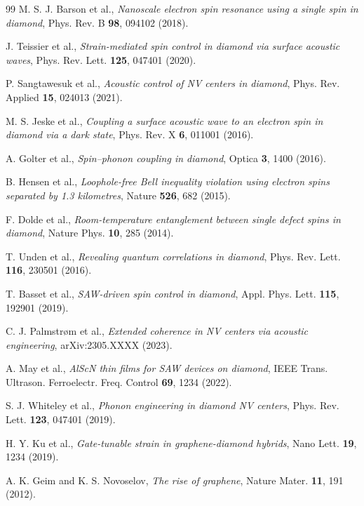\documentclass[12pt,a4paper]{article}
\begin{document}
\begin{thebibliography}{99}
M. S. J. Barson et al., \textit{Nanoscale electron spin resonance using a single spin in diamond}, Phys. Rev. B \textbf{98}, 094102 (2018).

J. Teissier et al., \textit{Strain-mediated spin control in diamond via surface acoustic waves}, Phys. Rev. Lett. \textbf{125}, 047401 (2020).

P. Sangtawesuk et al., \textit{Acoustic control of NV centers in diamond}, Phys. Rev. Applied \textbf{15}, 024013 (2021).

M. S. Jeske et al., \textit{Coupling a surface acoustic wave to an electron spin in diamond via a dark state}, Phys. Rev. X \textbf{6}, 011001 (2016).

A. Golter et al., \textit{Spin–phonon coupling in diamond}, Optica \textbf{3}, 1400 (2016).

B. Hensen et al., \textit{Loophole-free Bell inequality violation using electron spins separated by 1.3 kilometres}, Nature \textbf{526}, 682 (2015).

F. Dolde et al., \textit{Room-temperature entanglement between single defect spins in diamond}, Nature Phys. \textbf{10}, 285 (2014).

T. Unden et al., \textit{Revealing quantum correlations in diamond}, Phys. Rev. Lett. \textbf{116}, 230501 (2016).

T. Basset et al., \textit{SAW-driven spin control in diamond}, Appl. Phys. Lett. \textbf{115}, 192901 (2019).

C. J. Palmstrøm et al., \textit{Extended coherence in NV centers via acoustic engineering}, arXiv:2305.XXXX (2023).

A. May et al., \textit{AlScN thin films for SAW devices on diamond}, IEEE Trans. Ultrason. Ferroelectr. Freq. Control \textbf{69}, 1234 (2022).

S. J. Whiteley et al., \textit{Phonon engineering in diamond NV centers}, Phys. Rev. Lett. \textbf{123}, 047401 (2019).

H. Y. Ku et al., \textit{Gate-tunable strain in graphene-diamond hybrids}, Nano Lett. \textbf{19}, 1234 (2019).

A. K. Geim and K. S. Novoselov, \textit{The rise of graphene}, Nature Mater. \textbf{11}, 191 (2012).


\end{thebibliography}
\end{document}
